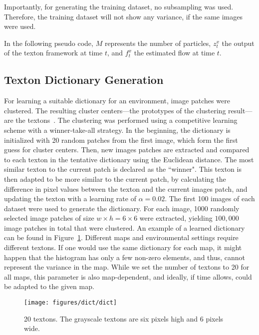 \documentclass{report}
\begin{document}
Importantly, for generating the training dataset, no subsampling was
used. Therefore, the training dataset will not show any variance, if
the same images were used.

In the following pseudo code, $M$ represents the number of particles,
$z_t^x$ the output of the texton framework at time $t$, and $f_t^x$
the estimated flow at time $t$.

\subsection{Texton Dictionary Generation}
\label{sec:text-dict-gener}

For learning a suitable dictionary for an environment, image patches
were clustered. The resulting cluster centers---the prototypes of the
clustering result---are the textons~\cite{varma2003texture}.  The
clustering was performed using a competitive learning scheme with a
winner-take-all strategy.  In the beginning, the dictionary is
initialized with 20 random patches from the first image, which form
the first guess for cluster centers. Then, new images patches are
extracted and compared to each texton in the tentative dictionary
using the Euclidean distance. The most similar texton to the current
patch is declared as the ``winner". This texton is then adapted to be
more similar to the current patch, by calculating the difference in
pixel values between the texton and the current images patch, and
updating the texton with a learning rate of $\alpha = 0.02$. The first
100 images of each dataset were used to generate the dictionary. For
each image, 1000 randomly selected image patches of size
$w \times h = 6 \times 6$ were extracted, yielding $100,000$ image
patches in total that were clustered.  An example of a learned
dictionary can be found in Figure~\ref{fig:dictionary}.  Different
maps and environmental settings require different textons. If one
would use the same dictionary for each map, it might happen that the
histogram has only a few non-zero elements, and thus, cannot represent
the variance in the map. While we set the number of textons to 20 for
all maps, this parameter is also map-dependent, and ideally, if time
allows, could be adapted to the given map.

\begin{figure}[h!]
\begin{center}
\texttt{[image: figures/dict/dict]}
\caption{{\label{fig:dictionary}
20 textons. The grayscale textons are six pixels high and 6 pixels wide.%
}}
\end{center}
\end{figure}
\end{document}
